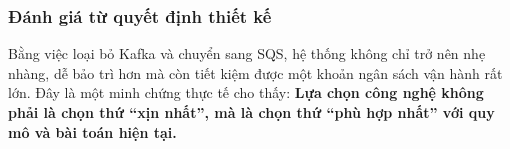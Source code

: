 \hypertarget{ux111uxe1nh-giuxe1-tux1eeb-quyux1ebft-ux111ux1ecbnh-thiux1ebft-kux1ebf}{%
\subsubsection{Đánh giá từ quyết định thiết
kế}}

Bằng việc loại bỏ Kafka và chuyển sang SQS, hệ thống không chỉ trở nên
nhẹ nhàng, dễ bảo trì hơn mà còn tiết kiệm được một khoản ngân sách vận
hành rất lớn. Đây là một minh chứng thực tế cho thấy: \textbf{Lựa chọn
công nghệ không phải là chọn thứ ``xịn nhất'', mà là chọn thứ ``phù hợp
nhất'' với quy mô và bài toán hiện tại.}
